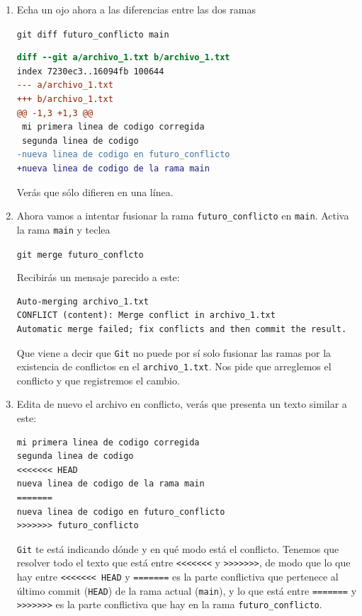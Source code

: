 \documentclass[a4paper,11pt]{report}
\newcommand{\cverb}{\Verb}
\begin{document}
\begin{enumerate}
     \item Echa un ojo ahora a las diferencias entre las dos ramas
     
     \cverb+git diff futuro_conflicto main+

    \begin{lstlisting}[language=diff]
diff --git a/archivo_1.txt b/archivo_1.txt
index 7230ec3..16094fb 100644
--- a/archivo_1.txt
+++ b/archivo_1.txt
@@ -1,3 +1,3 @@
 mi primera linea de codigo corregida
 segunda linea de codigo
-nueva linea de codigo en futuro_conflicto
+nueva linea de codigo de la rama main
    \end{lstlisting}
    Verás que sólo difieren en una línea.
    
    \item Ahora vamos a intentar fusionar la rama \verb+futuro_conflicto+ en \verb+main+. Activa la rama \verb+main+ y teclea
    
    \cverb+git merge futuro_conflcto+
    
    Recibirás un mensaje parecido a este:
    \begin{lstlisting}[style=custom]
Auto-merging archivo_1.txt
CONFLICT (content): Merge conflict in archivo_1.txt
Automatic merge failed; fix conflicts and then commit the result.
    \end{lstlisting}
    Que viene a decir que \verb+Git+ no puede por sí solo fusionar las ramas por la existencia de conflictos en el \verb+archivo_1.txt+. Nos pide que arreglemos el conflicto y que registremos el cambio.
    
    \item Edita de nuevo el archivo en conflicto, verás que presenta un texto similar a este:
    
    \begin{lstlisting}[style=custom]
mi primera linea de codigo corregida
segunda linea de codigo
<<<<<<< HEAD
nueva linea de codigo de la rama main
=======
nueva linea de codigo en futuro_conflicto
>>>>>>> futuro_conflicto
    \end{lstlisting}
    
    \verb+Git+ te está indicando dónde y en qué modo está el conflicto. Tenemos que resolver todo el texto que está entre \verb+<<<<<<<+ y \verb+>>>>>>>+, de modo que lo que hay entre \verb+<<<<<<< HEAD+ y \verb+=======+ es la parte conflictiva que pertenece al último commit (\verb+HEAD+) de la rama actual (\verb+main+), y lo que está entre \verb+=======+ y \verb+>>>>>>>+ es la parte conflictiva que hay en la rama \verb+futuro_conflicto+.
    

\end{enumerate}
\end{document}
